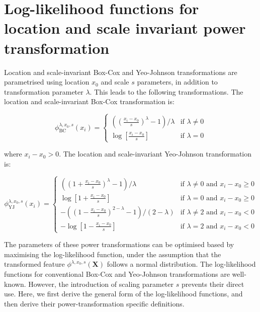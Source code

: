 \documentclass[preprint,12pt,authoryear]{elsarticle}
\begin{document}
\appendix
\section{Log-likelihood functions for location and scale
invariant power transformation}\label{appendix-a-log-likelihood-functions-for-location-and-scale-invariant-power-transformation}

Location and scale-invariant Box-Cox and Yeo-Johnson transformations are
parametrised using location \(x_0\) and scale \(s\) parameters, in
addition to transformation parameter \(\lambda\). This leads to the
following transformations. The location and scale-invariant Box-Cox
transformation is:

\begin{equation}
\phi_{\text{BC}}^{\lambda, x_0, s} (x_i) = 
\begin{cases}
\left( \left(\frac{x_i - x_0}{s} \right)^\lambda - 1 \right) / \lambda & \text{if } \lambda \neq 0\\
\log\left[\frac{x_i - x_0}{s}\right] & \text{if } \lambda = 0
\end{cases}
\end{equation}

where \(x_i - x_0 > 0\). The location and scale-invariant Yeo-Johnson
transformation is:

\begin{equation}
\phi_{\text{YJ}}^{\lambda, x_0, s} (x_i) = 
\begin{cases}
\left( \left( 1 + \frac{x_i - x_0}{s}\right)^\lambda - 1\right) / \lambda & \text{if } \lambda \neq 0 \text{ and } x_i - x_0 \geq 0\\
\log\left[1 + \frac{x_i - x_0}{s}\right] & \text{if } \lambda = 0 \text{ and } x_i - x_0 \geq 0\\
-\left( \left( 1 - \frac{x_i - x_0}{s}\right)^{2 - \lambda} - 1 \right) / \left(2 - \lambda \right) & \text{if } \lambda \neq 2 \text{ and } x_i - x_0 < 0\\
-\log\left[1 - \frac{x_i - x_0}{s}\right] & \text{if } \lambda = 2 \text{ and } x_i - x_0 < 0
\end{cases}
\end{equation}

The parameters of these power transformations can be optimised based by
maximising the log-likelihood function, under the assumption that the
transformed feature \(\phi^{\lambda, x_0, s} (\mathbf{X})\) follows a
normal distribution. The log-likelihood functions for conventional
Box-Cox and Yeo-Johnson transformations are well-known. However, the
introduction of scaling parameter \(s\) prevents their direct use. Here,
we first derive the general form of the log-likelihood functions, and
then derive their power-transformation specific definitions.
\end{document}
